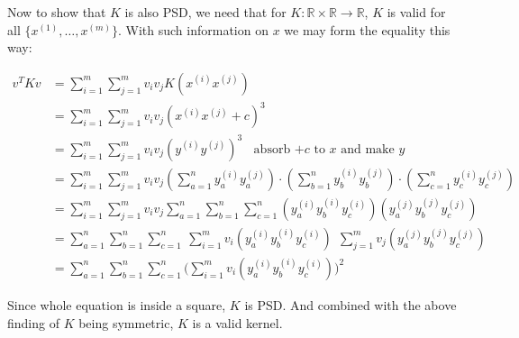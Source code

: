 \documentclass[12pt]{article}
\begin{document}
\noindent Now to show that $K$ is also PSD, we need that for $K: \mathbb{R} \times \mathbb{R} \rightarrow \mathbb{R}$, $K$ is valid for all $\{x^{(1)}, \dots, x^{(m)} \}$. With such information on $x$ we may form the equality this way:

\begin{align*}
    v^T K v &= \sum_{i=1}^{m} \sum_{j=1}^{m} v_i v_j K(x^{(i)} x^{(j)}) \\
    &= \sum_{i=1}^{m} \sum_{j=1}^{m} v_i v_j(x^{(i)} x^{(j)} + c)^3 \\
    &= \sum_{i=1}^{m} \sum_{j=1}^{m} v_i v_j(y^{(i)} y^{(j)} )^3 \ \ \ \ \text{absorb $+c$ to $x$ and make $y$} \\
    &= \sum_{i=1}^{m} \sum_{j=1}^{m} v_i v_j (\sum_{a = 1}^{n} y_{a}^{(i)} y_{a}^{(j)}) \cdot (\sum_{b = 1}^{n} y_{b}^{(i)} y_{b}^{(j)}) \cdot (\sum_{c = 1}^{n} y_{c}^{(i)} y_{c}^{(j)}) \\
    &= \sum_{i=1}^{m} \sum_{j=1}^{m} v_i v_j \sum_{a = 1}^{n} \sum_{b = 1}^{n} \sum_{c = 1}^{n} (y_{a}^{(i)} y_{b}^{(i)} y_{c}^{(i)}) (y_{a}^{(j)} y_{b}^{(j)} y_{c}^{(j)}) \\
    &= \sum_{a = 1}^{n} \sum_{b = 1}^{n} \sum_{c = 1}^{n} \ \sum_{i=1}^{m} v_i (y_{a}^{(i)} y_{b}^{(i)} y_{c}^{(i)}) \ \ \sum_{j=1}^{m} v_j (y_{a}^{(j)} y_{b}^{(j)} y_{c}^{(j)}) \\
    &= \sum_{a = 1}^{n} \sum_{b = 1}^{n} \sum_{c = 1}^{n} \big(\sum_{i=1}^{m} v_i (y_{a}^{(i)} y_{b}^{(i)} y_{c}^{(i)})\big)^2
\end{align*}

Since whole equation is inside a square, $K$ is PSD. And combined with the above finding of $K$ being symmetric, $K$ is a valid kernel.


% 
% 
\end{document}
